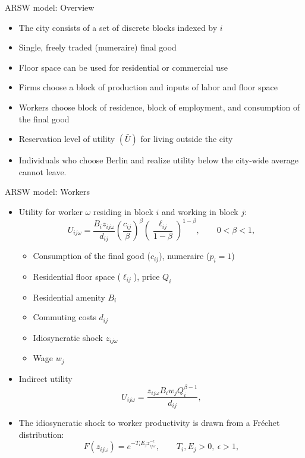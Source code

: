 \documentclass[10pt,notes=hide]{beamer}
\begin{document}
\begin{frame}{ARSW model: Overview}
\begin{itemize}
\item The city consists of a set of discrete blocks indexed by $i$ 
\item Single, freely traded (numeraire) final good
\item Floor space can be used for residential or commercial use
\item Firms choose a block of production and inputs of labor and floor space 
\item Workers choose block of residence, block of employment, and consumption of the final good 
\item Reservation level of utility $(\bar{U})$ for living outside the city
\item[] {\small Individuals who choose Berlin and realize utility below the city-wide average cannot leave.\par}
\end{itemize}
\end{frame}
\begin{frame}{ARSW model: Workers }
\begin{itemize}
\item Utility for worker $\omega$ residing in block $i$ and working in block $j$:
\begin{equation*}
U_{ij \omega} = \frac{B_{i} z_{ij\omega}}{d_{ij}}
\left( \frac{c_{ij}}{\beta} \right)^{\beta } \left( \frac{\ell
_{ij }}{1-\beta} \right)^{1-\beta },\qquad 0<\beta <1, 
\end{equation*}
    \begin{itemize}
    \item Consumption of the final good ($c_{ij}$), numeraire ($p_{i}=1$)
    \item Residential floor space ($\ell_{ij}$), price $Q_{i}$
    \item Residential amenity $B_{i}$
    \item Commuting costs $d_{ij}$
    \item Idiosyncratic shock $z_{ij\omega}$ 
    \item Wage $w_{j}$
    \end{itemize}
\item Indirect utility
\begin{equation*}
U_{ij\omega} = \frac{z_{ij\omega} B_{i} w_{j} Q_{i}^{\beta-1}}{d_{ij}},
\end{equation*}
\item The idiosyncratic shock to worker productivity is drawn from a Fr\'{e}chet distribution:
\begin{equation*}
F(z_{ij\omega})=e^{-T_{i} E_{j} z_{ij\omega}^{-\epsilon }},\qquad T_{i}, E_{j} >0,\ \epsilon >1,  
\end{equation*}
\end{itemize}
\end{frame}
\end{document}
